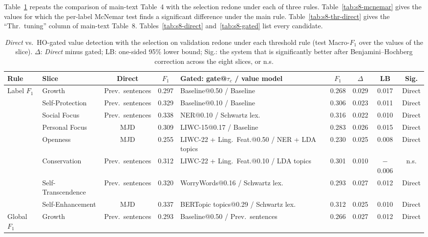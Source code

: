 Table~\ref{tab:s8-values-rules} repeats the comparison of main-text Table~4 with the selection redone under each of three rules. Table~\ref{tab:s8-mcnemar} gives the values for which the per-label McNemar test finds a significant difference under the main rule. Table~\ref{tab:s8-thr-direct} gives the ``Thr.\ tuning'' column of main-text Table~8. Tables~\ref{tab:s8-direct} and~\ref{tab:s8-gated} list every candidate.

\begin{table}[!htbp]
\centering
\scriptsize
\caption{\emph{Direct} vs.\ HO-gated value detection with the selection on validation redone under each threshold rule (test Macro-$F_1$ over the values of the slice). $\Delta$: \emph{Direct} minus gated; LB: one-sided 95\% lower bound; Sig.: the system that is significantly better after Benjamini--Hochberg correction across the eight slices, or n.s.}
\label{tab:s8-values-rules}
\begin{tabularx}{\textwidth}{llccXcccc}
\hline
\textbf{Rule} & \textbf{Slice} & \textbf{Direct} & \textbf{$F_1$} & \textbf{Gated: gate@$\tau_c$ / value model} & \textbf{$F_1$} & \textbf{$\Delta$} & \textbf{LB} & \textbf{Sig.} \\
\hline
Label $F_1$ & Growth & Prev.\ sentences & 0.297 & Baseline@0.50 / Baseline & 0.268 & 0.029 & 0.017 & Direct \\
 & Self-Protection & Prev.\ sentences & 0.329 & Baseline@0.10 / Baseline & 0.306 & 0.023 & 0.011 & Direct \\
 & Social Focus & Prev.\ sentences & 0.338 & NER@0.10 / Schwartz lex. & 0.316 & 0.022 & 0.010 & Direct \\
 & Personal Focus & MJD & 0.309 & LIWC-15@0.17 / Baseline & 0.283 & 0.026 & 0.015 & Direct \\
 & Openness & MJD & 0.255 & LIWC-22 + Ling.\ Feat.@0.50 / NER + LDA topics & 0.230 & 0.025 & 0.008 & Direct \\
 & Conservation & Prev.\ sentences & 0.312 & LIWC-22 + Ling.\ Feat.@0.10 / LDA topics & 0.301 & 0.010 & $-$0.006 & n.s. \\
 & Self-Transcendence & Prev.\ sentences & 0.320 & WorryWords@0.16 / Schwartz lex. & 0.293 & 0.027 & 0.012 & Direct \\
 & Self-Enhancement & MJD & 0.337 & BERTopic topics@0.29 / Schwartz lex. & 0.312 & 0.025 & 0.010 & Direct \\
Global $F_1$ & Growth & Prev.\ sentences & 0.293 & Baseline@0.50 / Prev.\ sentences & 0.266 & 0.027 & 0.012 & Direct \\

\end{tabularx}
\end{table}
